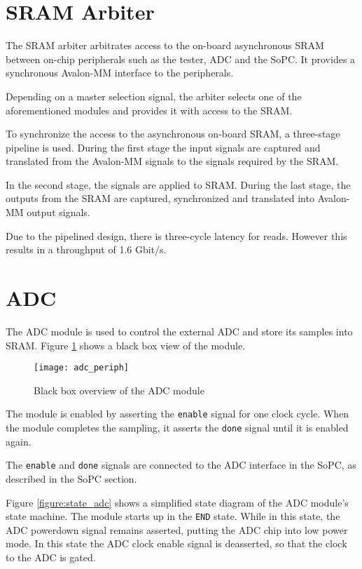 \newpage
\section{SRAM Arbiter}

The SRAM arbiter arbitrates access to the on-board asynchronous SRAM between on-chip peripherals such as the tester, ADC and the SoPC. It provides
a synchronous Avalon-MM interface to the peripherals.

Depending on a master selection signal, the arbiter selects one of the aforementioned modules and provides it with access to the SRAM.

To synchronize the access to the asynchronous on-board SRAM, a three-stage pipeline is used. During the first stage
the input signals are captured and translated from the Avalon-MM signals to the signals required by the SRAM.

In the second stage, the signals are applied to SRAM. During the last stage, the outputs from the SRAM are captured, synchronized and translated
into Avalon-MM output signals.

Due to the pipelined design, there is three-cycle latency for reads. However this results in a throughput of 1.6 Gbit/s.


\newpage
\section{ADC}
The ADC module is used to control the external ADC and store its samples into SRAM.
Figure \ref{figure:adc_blackbox} shows a black box view of the module.
\begin{figure}[h!]
\begin{center}
\texttt{[image: adc\_periph]}
\caption{Black box overview of the ADC module}
\label{figure:adc_blackbox}
\end{center}
\end{figure}

The module is enabled by asserting the \texttt{enable} signal for one clock cycle. When
the module completes the sampling, it asserts the \texttt{done} signal until it is enabled
again.

The \texttt{enable} and \texttt{done} signals are connected to the ADC interface
in the SoPC, as described in the SoPC section.


Figure \ref{figure:state_adc} shows a simplified state diagram of the ADC module's state
machine. The module starts up in the \texttt{END} state. While in this state, the
ADC powerdown signal remains asserted, putting the ADC chip into low power mode. In this
state the ADC clock enable signal is deasserted, so that the clock to the ADC is gated.

